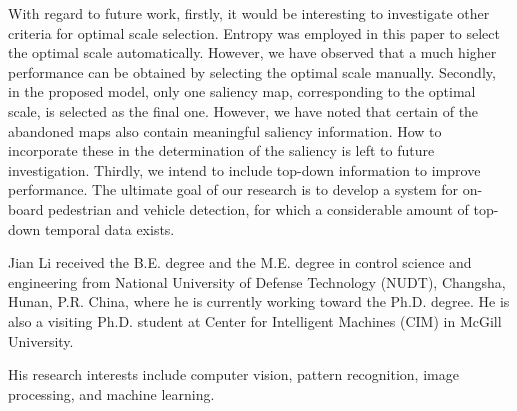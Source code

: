 \documentclass[10pt,journal,cspaper,compsoc]{IEEEtran}
\begin{document}
With regard to future work, firstly, it would be interesting to investigate other criteria for optimal scale selection. Entropy was employed in this paper to select the optimal scale automatically. However, we have observed that a much higher performance can be obtained by selecting the optimal scale manually. Secondly, in the proposed model, only one saliency map, corresponding to the optimal scale, is selected as the final one. However, we have noted that certain of the abandoned maps also contain meaningful saliency information. How to incorporate these in the determination of the saliency is left to future investigation. Thirdly, we intend to include top-down information to improve performance. The ultimate goal of our research is to develop a system for on-board pedestrian and vehicle detection, for which a considerable amount of top-down temporal data exists.
{\small


}
\begin{IEEEbiography}{Jian Li}
received the B.E. degree and the M.E. degree in control science and engineering from National University of Defense Technology (NUDT), Changsha, Hunan, P.R. China, where he is currently working toward the Ph.D. degree. He is also a visiting Ph.D. student at Center for Intelligent Machines (CIM) in McGill University. 	

His research interests include computer vision, pattern recognition, image processing, and machine learning.
\end{IEEEbiography}
\end{document}
